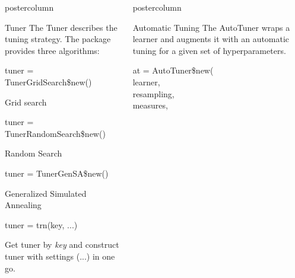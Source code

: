 \documentclass{beamer}
\newlength{\columnheight} %
\begin{document}
\begin{frame}[fragile]{}
\begin{columns}
\begin{column}{.245\textwidth}
			\begin{beamercolorbox}[center]{postercolumn}
				\begin{minipage}{.98\textwidth}
					\parbox[t][\columnheight]{\textwidth}{
						\begin{myblock}{Tuner}
							The Tuner describes the tuning strategy. The package provides three algorithms:
							\\
							\begin{codebox}
								tuner = TunerGridSearch\$new()
							\end{codebox}
							Grid search
							\\
							\begin{codebox}
								tuner = TunerRandomSearch\$new()
							\end{codebox}
							Random Search
							\\
							\begin{codebox}
								tuner = TunerGenSA\$new()
							\end{codebox}
							Generalized Simulated Annealing
							\\
							\begin{codebox}
								tuner = trn(key, ...)
							\end{codebox}
							Get tuner by \textit{key} and construct tuner with settings (...) in one go.
						\end{myblock}
					\vfill}
				\end{minipage}
			\end{beamercolorbox}
		\end{column}
		\begin{column}{.245\textwidth}
			\begin{beamercolorbox}[center]{postercolumn}
				\begin{minipage}{.98\textwidth}
					\parbox[t][\columnheight]{\textwidth}{
						\begin{myblock}{Automatic Tuning}
						The AutoTuner wraps a learner and augments it with an automatic tuning for a given set of hyperparameters. 
						\\
						\begin{codeboxmultiline}[width=18cm]
							at = AutoTuner\$new(
\\
							\hspace*{1ex}learner,
\\
							\hspace*{1ex}resampling,
\\
							\hspace*{1ex}measures,
\\

\end{codeboxmultiline}
\end{myblock}}
\end{minipage}
\end{beamercolorbox}
\end{column}
\end{columns}
\end{frame}
\end{document}
